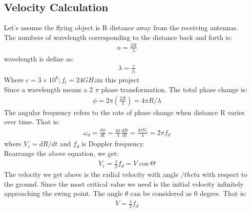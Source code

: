\subsection{Velocity Calculation}
Let’s assume the flying object is R distance away from the receiving antennas. The numbers of wavelength corresponding to the distance back and forth is:
\begin{align}
n=\frac{2 R}{\lambda}    
\end{align}
wavelength is define as:
\begin{align}
\lambda=\frac{c}{f_{t}}
\end{align}
Where $c=3 \times 10^{8} ; f_{t}=24 G H z$in this project\\
Since a wavelength means a 2 $\pi$ phase transformation. The total phase change is:
\begin{align}
\phi=2 \pi\left(\frac{2 R}{\lambda}\right)=4 \pi R / \lambda
\end{align}
The angular frequency refers to the rate of phase change when distance R varies over time. That is:
\begin{align}
\omega_{d}=\frac{d \phi}{d t}=\frac{4 \pi}{\lambda} \frac{d R}{d t}=\frac{4 \pi V_{r}}{\lambda}=2 \pi f_{d}
\end{align}
where $V_{r}=d R / d t$ and $f_{d}$ is Doppler frequency.\\
Rearrange the above equation, we get:
\begin{align}
V_{r}=\frac{\lambda}{2} f_{d}=V \cos \Theta
\end{align}
The velocity we get above is the radial velocity with angle $/theta$ with respect to the ground. Since the most critical value we need is the initial velocity infinitely approaching the swing point. The angle $\theta$ can be considered as 0 degree. That is:
\begin{align}
V=\frac{\lambda}{2} f_{d}
\end{align}


